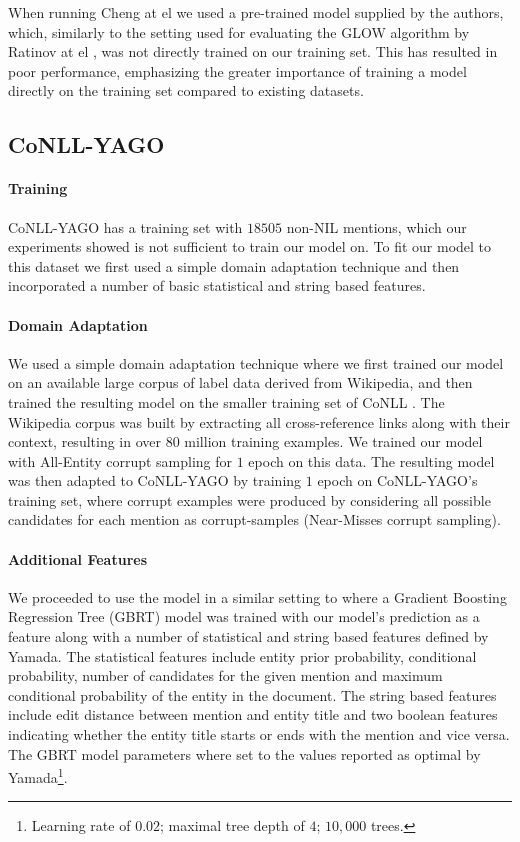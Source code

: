 \documentclass[11pt,letterpaper]{article}
\begin{document}
	When running Cheng at el  we used a pre-trained model supplied by the authors, which, similarly to the setting used for evaluating the GLOW algorithm by Ratinov at el \cite{ratinov2011glow}, was not directly trained on our training set. This has resulted in poor performance, emphasizing the greater importance of training a model directly on the training set compared to existing datasets.
	
	\subsection{CoNLL-YAGO}
	\label{experiments-conll}
	
	\paragraph{Training}
	CoNLL-YAGO has a training set with $18505$ non-NIL mentions, which our experiments showed is not sufficient to train our model on. To fit our model to this dataset we first used a simple domain adaptation technique and then incorporated a number of basic statistical and string based features.
	
	\paragraph{Domain Adaptation}
	We used a simple domain adaptation technique where we first trained our model on an available large corpus of label data derived from Wikipedia, and then trained the resulting model on the smaller training set of CoNLL \cite{mou2016How}. The Wikipedia corpus was built by extracting all cross-reference links along with their context, resulting in over $80$ million training examples. We trained our model with All-Entity corrupt sampling for $1$ epoch on this data. The resulting model was then adapted to CoNLL-YAGO by training $1$ epoch on CoNLL-YAGO's training set, where corrupt examples were produced by considering all possible candidates for each mention as corrupt-samples (Near-Misses corrupt sampling).

	\paragraph{Additional Features}	
	We proceeded to use the model in a similar setting to  where a Gradient Boosting Regression Tree (GBRT) \cite{friedman2001greedy} model was trained with our model's prediction as a feature along with a number of statistical and string based features defined by Yamada. The statistical features include entity prior probability, conditional probability, number of candidates for the given mention and maximum conditional probability of the entity in the document. The string based features include edit distance between mention and entity title and two boolean features indicating whether the entity title starts or ends with the mention and vice versa. The GBRT model parameters where set to the values reported as optimal by Yamada\footnote{Learning rate of $0.02$; maximal tree depth of $4$; $10,000$ trees.}.
			
\end{document}
